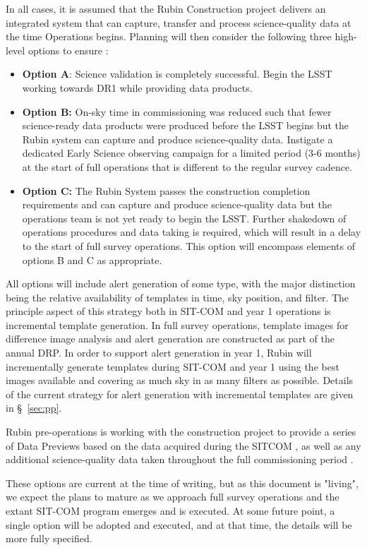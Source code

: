 In all cases, it is assumed that the Rubin Construction project delivers an integrated system that can capture, transfer and process science-quality data at the time Operations begins.
Planning will then consider the following three high-level options to ensure \es:
\begin{itemize}
\item \textbf{Option A}:
Science validation is completely successful.
Begin the LSST working towards DR1 while providing \es data products.
\item \textbf{Option B:}
On-sky time in commissioning was reduced such that fewer science-ready data products were produced before the LSST begins but the Rubin system can capture and produce science-quality data.
Instigate a dedicated Early Science observing campaign for a limited period (3-6 months) at the start of full operations that is different to the regular survey cadence.
\item \textbf{Option C:}
The Rubin System  passes the construction completion requirements and can capture and produce science-quality data but the operations team is not yet ready to begin the LSST.
Further shakedown of operations procedures and data taking is required, which will result in a delay to the start of full survey operations.
This option will encompass elements of options B and C as appropriate.
\end{itemize}

All options will include alert generation of some type, with the major distinction being the relative availability of templates in time, sky position, and filter.
The principle aspect of this strategy both  in SIT-COM and year 1 operations is incremental template generation.
In full survey operations, template images for difference image analysis and alert generation are constructed as part of the annual DRP.
In order to support alert generation in year 1, Rubin will incrementally generate templates during SIT-COM and year 1 using the best images available and covering as much sky  in as many filters as possible.
Details of the current strategy for alert generation  with incremental templates are given in  \S~\ref{sec:pp}.

Rubin pre-operations is working with the construction project to provide a series of Data Previews based on the data acquired during the SITCOM \svs, as well as any additional science-quality data taken throughout the full commissioning period \citep{RDO-011}.

These options are current at the time of writing, but as this document is "living",  we expect the plans to mature as we approach full survey operations and the extant SIT-COM program emerges and is executed.
At some future point, a single option will be adopted and executed, and at that time, the details will be more fully specified.
